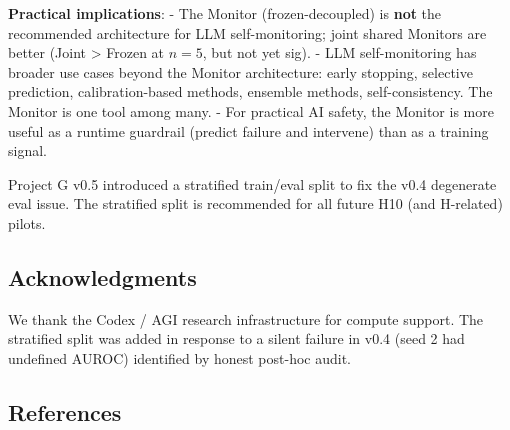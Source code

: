 \documentclass[
]{article}
\begin{document}
\textbf{Practical implications}: - The Monitor (frozen-decoupled) is
\textbf{not} the recommended architecture for LLM self-monitoring; joint
shared Monitors are better (Joint \textgreater{} Frozen at \(n=5\), but
not yet sig). - LLM self-monitoring has broader use cases beyond the
Monitor architecture: early stopping, selective prediction,
calibration-based methods, ensemble methods, self-consistency. The
Monitor is one tool among many. - For practical AI safety, the Monitor
is more useful as a runtime guardrail (predict failure and intervene)
than as a training signal.

Project G v0.5 introduced a stratified train/eval split to fix the v0.4
degenerate eval issue. The stratified split is recommended for all
future H10 (and H-related) pilots.

\subsection{Acknowledgments}\label{acknowledgments}

We thank the Codex / AGI research infrastructure for compute support.
The stratified split was added in response to a silent failure in v0.4
(seed 2 had undefined AUROC) identified by honest post-hoc audit.

\subsection{References}\label{references}
\end{document}
